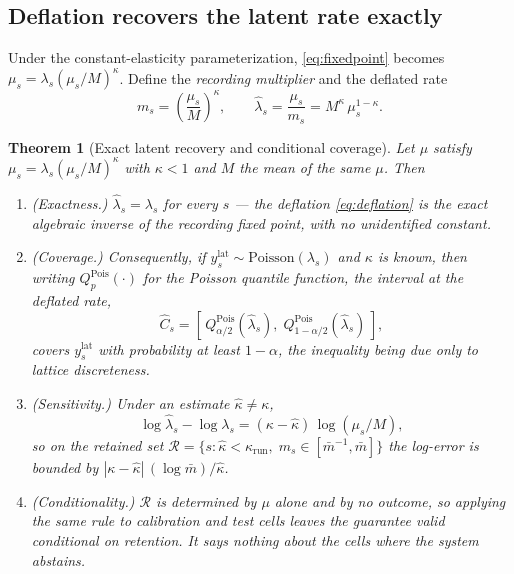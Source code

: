 \documentclass[journal,10pt,twocolumn]{IEEEtran}
\newtheorem{theorem}{Theorem}
\begin{document}
\subsection{Deflation recovers the latent rate exactly}
Under the constant-elasticity parameterization, \eqref{eq:fixedpoint} becomes
$\mu_s = \lambda_s (\mu_s/M)^{\kappa}$. Define the \emph{recording multiplier}
and the deflated rate
\begin{equation}
\label{eq:deflation}
m_s = \left(\frac{\mu_s}{M}\right)^{\kappa},
\qquad
\hat{\lambda}_s = \frac{\mu_s}{m_s} = M^{\kappa}\,\mu_s^{1-\kappa}.
\end{equation}

\begin{theorem}[Exact latent recovery and conditional coverage]
\label{thm:deflation}
Let $\mu$ satisfy $\mu_s = \lambda_s(\mu_s/M)^{\kappa}$ with $\kappa < 1$ and
$M$ the mean of the same $\mu$. Then
\begin{enumerate}
  \item[(i)] \emph{(Exactness.)} $\hat{\lambda}_s = \lambda_s$ for every $s$ ---
  the deflation \eqref{eq:deflation} is the exact algebraic inverse of the
  recording fixed point, with no unidentified constant.
  \item[(ii)] \emph{(Coverage.)} Consequently, if $y^{\mathrm{lat}}_s \sim
  \mathrm{Poisson}(\lambda_s)$ and $\kappa$ is known, then writing $Q^{\mathrm{Pois}}_p(\cdot)$
  for the Poisson quantile function, the interval at the deflated rate,
  \begin{equation}
  \label{eq:latent_interval}
  \widehat{C}_s = \left[\,
    Q^{\mathrm{Pois}}_{\alpha/2}(\hat{\lambda}_s),\;
    Q^{\mathrm{Pois}}_{1-\alpha/2}(\hat{\lambda}_s)
  \,\right],
  \end{equation}
  covers $y^{\mathrm{lat}}_s$ with probability at least $1-\alpha$, the
  inequality being due only to lattice discreteness.
  \item[(iii)] \emph{(Sensitivity.)} Under an estimate $\hat\kappa \ne \kappa$,
  \begin{equation}
  \label{eq:sensitivity}
  \log \hat{\lambda}_s - \log \lambda_s
   = (\kappa - \hat\kappa)\,\log\!\left(\mu_s / M\right),
  \end{equation}
  so on the retained set
  $\mathcal{R} = \{s : \hat\kappa < \kappa_{\mathrm{run}},\;
   m_s \in [\bar{m}^{-1}, \bar{m}]\}$ the log-error is bounded by
  $|\kappa - \hat\kappa|\,(\log \bar{m})/\hat\kappa$.
  \item[(iv)] \emph{(Conditionality.)} $\mathcal{R}$ is determined by $\mu$ alone
  and by no outcome, so applying the same rule to calibration and test cells
  leaves the guarantee valid \emph{conditional on retention}. It says nothing
  about the cells where the system abstains.
\end{enumerate}
\end{theorem}
\end{document}
